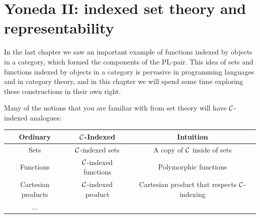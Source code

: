 

\chapter{Yoneda II: indexed set theory and representability}


In the last chapter we saw an important example of functions indexed by objects
in a category, which formed the components of the PL-pair. This idea of sets and
functions indexed by objects in a category is pervasive in programming languages
and in category theory, and in this chapter we will spend some time 
exploring these constructions in their own right.

Many of the notions that you are familiar with from set theory will have 
$\mathcal C$-indexed analogues:

\begin{fullwidth}
 \begin{center}
 \begin{tabular}{ccc}
  \toprule
  \textbf{Ordinary} & \textbf{$\mathcal C$-Indexed} & \textbf{Intuition} \\
  \midrule 
  Sets & $\mathcal C$-indexed sets & A copy of $\mathcal C$ inside of sets \\
  Functions & $\mathcal C$-indexed functions & Polymorphic functions \\
  Cartesian products & $\mathcal C$-indexed product & Cartesian product that respects $\mathcal C$-indexing \\
  ... & & \\
  \bottomrule
\end{tabular}
\end{center}
\end{fullwidth}

